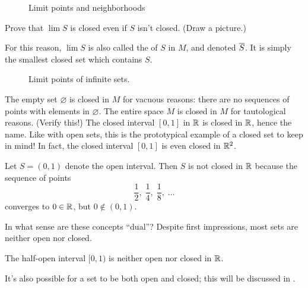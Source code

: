 \begin{figure}[ht]
	\centering
	\caption{Limit points and neighborhoods}
\end{figure}

\begin{exercise}
	Prove that $\lim S$ is closed even if $S$ isn't closed. (Draw a picture.)
\end{exercise}
For this reason, $\lim S$ is also called the  of $S$ in $M$,
and denoted $\overline S$.  It is simply the smallest closed set which contains $S$.

\begin{figure}[ht]
	\centering
	\caption{Limit points of infinite sets.}
\end{figure}

\begin{example}
	\listhack
	\begin{enumerate}[(a)]
		\ii The empty set $\varnothing$ is closed in $M$ for vacuous reasons:
		there are no sequences of points with elements in $\varnothing$.
		\ii The entire space $M$ is closed in $M$ for tautological reasons.
		(Verify this!)
		\ii The closed interval $[0,1]$ in $\mathbb R$ is closed in $\mathbb R$, hence the name.  Like with open sets, this is the prototypical example of a closed set to keep in mind!
		\ii In fact, the closed interval $[0,1]$ is even closed in $\mathbb R^2$.
	\end{enumerate}
\end{example}
\begin{example}
	Let $S=(0,1)$ denote the open interval.
	Then $S$ is not closed in $\mathbb R$
	because the sequence of points
	\[
		\frac12, \;
		\frac14, \;
		\frac18, \;
		\dots
	\]
	converges to $0 \in \mathbb R$, but $0 \notin (0,1)$.
\end{example}

In what sense are these concepts ``dual''?
Despite first impressions, most sets are neither open nor closed.
\begin{example}
	The half-open interval $[0,1)$ is neither open nor closed in $\mathbb R$.
\end{example}
\begin{remark}
	It's also possible for a set to be both open and closed;
	this will be discussed in .
\end{remark}


